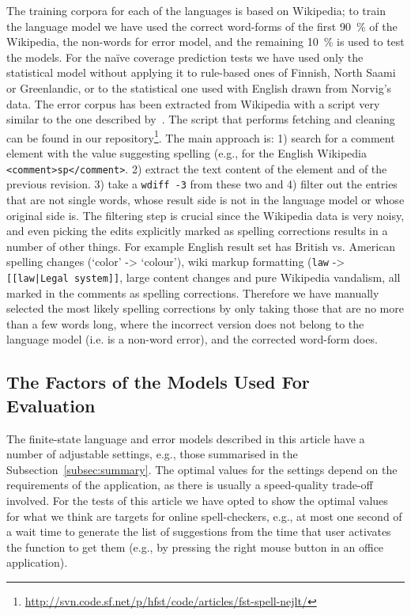 \documentclass[a4paper,12pt]{article}
\begin{document}
The training corpora for each of the languages is based on Wikipedia; to train
the language model we have used the correct word-forms of the first 90~\% of
the Wikipedia, the non-words for error model, and the remaining 10~\% is used
to test the models. For the naïve coverage prediction tests we have used only
the statistical model without applying it to rule-based ones of Finnish, North
Saami or Greenlandic, or to the statistical one used with English drawn from
Norvig's data. The error corpus has been extracted from Wikipedia
with a script very similar to the one described by~\cite{max2010mining}. The
script that performs fetching and cleaning can be found in our
repository\footnote{\url{http://svn.code.sf.net/p/hfst/code/articles/fst-spell-nejlt/}}. The main approach is: 1) search for a comment
element with the value suggesting spelling (e.g., for the English Wikipedia
\texttt{<comment>sp</comment>}. 2) extract the text content of the element and
of the previous revision. 3) take a \texttt{wdiff -3} from these two and 4)
filter out the entries that are not single words, whose result side is not in
the language model or whose original side is.  The filtering step is crucial
since the Wikipedia data is very noisy, and even picking the edits explicitly
marked as spelling corrections results in a number of other things. For example
English result set has British vs.  American spelling changes (`color' ->
`colour'), wiki markup formatting (\texttt{law} -> \texttt{[[law|Legal
system]]}, large content changes and pure Wikipedia vandalism, all marked in
the comments as spelling corrections. Therefore we have manually selected the
most likely spelling corrections by only taking those that are no more than a
few words long, where the incorrect version does not belong to the language
model (i.e.  is a non-word error), and the corrected word-form does.

\subsection{The Factors of the Models Used For Evaluation}
\label{subsec:factors}

The finite-state language and error models described in this article have a
number of adjustable settings, e.g., those summarised in the
Subsection~\ref{subsec:summary}. The optimal values for the settings depend on
the requirements of the application, as there is usually a speed-quality
trade-off involved. For the tests of this article we have opted to show the
optimal values for what we think are targets for online spell-checkers, e.g., at
most one second of a wait time to generate the list of suggestions from the
time that user activates the function to get them (e.g., by pressing the right
mouse button in an office application).
\end{document}
